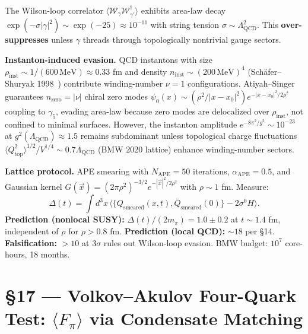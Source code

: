 \documentclass[11pt,a4paper]{article}
\newcommand{\Lqcd}{\Lambda_{\text{QCD}}}
\newcommand{\mpi}{m_\pi}
\begin{document}
The Wilson-loop correlator $\langle\mathcal{W}_\gamma\mathcal{W}_{\gamma'}^\dagger\rangle$ exhibits area-law decay $\exp(-\sigma |\gamma|^2) \sim \exp(-25) \approx 10^{-11}$ with string tension $\sigma \sim \Lqcd^2$.  This \textbf{over-suppresses} unless $\gamma$ threads through topologically nontrivial gauge sectors.

\textbf{Instanton-induced evasion.}  QCD instantons with size $\rho_{\text{inst}} \sim 1/(600\,\text{MeV}) \approx 0.33$ fm and density $n_{\text{inst}} \sim (200\,\text{MeV})^4$ (Sch\"afer--Shuryak 1998~\cite{SchaferShuryak:1998}) contribute winding-number $\nu=1$ configurations.  Atiyah--Singer guarantees $n_{\text{zero}} = |\nu|$ chiral zero modes $\psi_0(x) \sim (\rho^2/|x-x_0|^2)e^{-|x-x_0|^2/2\rho^2}$ coupling to $\gamma_5$, evading area-law because zero modes are delocalized over $\rho_{\text{inst}}$, not confined to minimal surfaces.  However, the instanton amplitude $e^{-8\pi^2/g^2} \sim 10^{-23}$ at $g^2(\Lqcd) \approx 1.5$ remains subdominant unless topological charge fluctuations $\langle Q_{\text{top}}^2\rangle^{1/2}/V^{1/4} \sim 0.7\Lqcd$ (BMW 2020 lattice) enhance winding-number sectors.

\textbf{Lattice protocol.}  APE smearing with $N_{\text{APE}}=50$ iterations, $\alpha_{\text{APE}}=0.5$, and Gaussian kernel $G(\vec{x}) = (2\pi\rho^2)^{-3/2}e^{-|\vec{x}|^2/2\rho^2}$ with $\rho \sim 1$ fm.  Measure:
\begin{equation}
\Delta(t) = \int d^3x\,\langle\{Q_{\text{smeared}}(x,t),\bar{Q}_{\text{smeared}}(0)\} - 2\sigma^0 H\rangle.
\end{equation}
\textbf{Prediction (nonlocal SUSY):} $\Delta(t)/(2\mpi) = 1.0 \pm 0.2$ at $t \sim 1.4$ fm, independent of $\rho$ for $\rho > 0.8$ fm.  \textbf{Prediction (local QCD):} $\sim 18$ per \S 14.  \textbf{Falsification:} ${>}10$ at $3\sigma$ rules out Wilson-loop evasion.  BMW budget: $10^7$ core-hours, 18 months.

\section*{\S 17 --- Volkov--Akulov Four-Quark Test: $\langle F_\pi\rangle$ via Condensate Matching}
\end{document}
